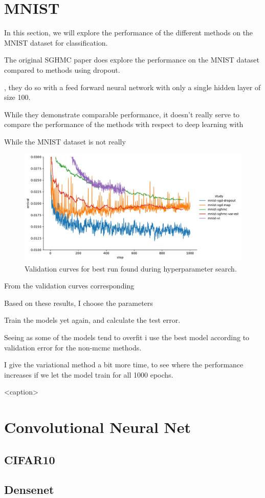 \section{MNIST}
In this section, we will explore the performance of the different methods on the MNIST dataset for classification.

The original SGHMC paper does explore the performance on the MNIST dataset compared to methods using dropout. 


, they do so with a feed forward neural network with only a single hidden layer of size 100.

While they demonstrate comparable performance, it doesn't really serve to compare the performance of the methods with respect to deep learning with  

While the MNIST dataset is not really

\begin{figure}[htbp]
    \centering
    \includegraphics[width=.9\linewidth]{Figures/mnist-best-runs-val-curves.pdf}
    \caption{Validation curves for best run found during hyperparameter search.}
    \label{<label>}
\end{figure}

From the validation curves corresponding 

Based on these results, I choose the parameters


Train the models yet again, and calculate the test error.

Seeing as some of the models tend to overfit i use the best model according to validation error for the non-mcmc methods.

I give the variational method a bit more time, to see where the performance increases if we let the model train for all 1000 epochs.



\begin{table}[htbp]
    \centering
    
    \caption{<caption>}
    \label{tab:mnist-test-err}
\end{table}


\section{Convolutional Neural Net}

\subsection{CIFAR10}

\subsection{Densenet}


